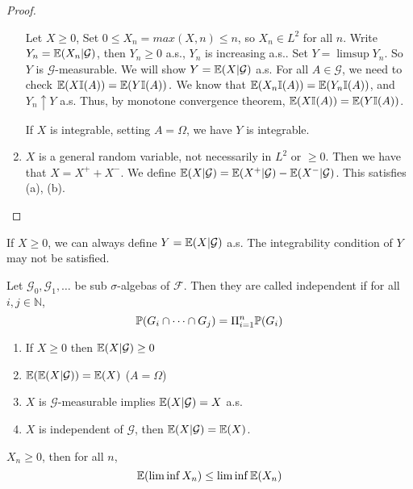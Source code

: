 \begin{proof}
\begin{enumerate}
  Let $X \geq 0$, Set $0 \leq X_{n} = max(X, n) \leq n$, so $X_{n} \in
  L^{2}$ for all $n$. Write $Y_{n} = \E{X_{n} | \mathcal{G}}$, then
  $Y_{n} \geq 0$ a.s., $Y_{n}$ is increasing a.s..  Set $Y = \limsup
  Y_{n}$.  So $Y$ is $\mathcal{G}$-measurable.  We will show $Y = \E{X
    | \mathcal{G}}$ a.s.  For all $A \in \mathcal{G}$, we need to
  check $\E{X \I{A}} = \E{Y \I{A}}.$ We know that
  $\E{X_{n} \I{A}} = \E{Y_{n} \I{A}}$, and $Y_{n}
  \uparrow Y$ a.s.  Thus, by monotone convergence theorem, $\E{X
    \I{A}} = \E{Y\I{A}}$.
  
  If $X$ is integrable, setting $A = \Omega$, we have $Y$ is
  integrable.
\item $X$ is a general random variable, not necessarily in $L^{2}$ or
  $\geq 0$.  Then we have that $X = X^{+} + X^{-}$.  We define $\E{X |
    \mathcal{G}} = \E{X^{+} | \mathcal{G}} - \E{X^{-} | \mathcal{G}}$.
  This satisfies (a), (b).
\end{enumerate}
\end{proof}

\begin{remark}
  If $X \geq 0$, we can always define $Y = \E{X | \mathcal{G}}$ a.s.
  The integrability condition of $Y$ may not be satisfied.
\end{remark}

\begin{defn}
  \label{defn:general:1}
  Let $\mathcal{G}_{0}, \mathcal{G}_{1}, \dots$ be sub $\sigma$-algebas of
  $\mathcal{F}$.  Then they are called independent if for all $i, j
  \in \mathbb{N}$,
  \begin{equation}
    \label{exmp:general:5}
    \Prob{G_i \cap \dots \cap G_j} = \Pi_{i = 1}^{n} \Prob{G_{i}}
  \end{equation}
\end{defn}

\begin{thm}
  \begin{enumerate}
  \item If $X \geq 0$ then $\E{X | \mathcal{G}} \geq 0$
  \item $\E{\E{X | \mathcal{G}}} = \E{X}$ ($A = \Omega$)
  \item $X$ is $\mathcal{G}$-measurable implies $\E{X | \mathcal{G}} = X$ a.s.
  \item $X$ is independent of $\mathcal{G}$, then $\E{X|\mathcal{G}} = \E{X}$.
  \end{enumerate}
\end{thm}

\begin{thm} $X_{n} \geq 0$, then for all $n$,
  \begin{equation}
    \label{exmp:general:6}
    \E{\liminf X_{n}} \leq \liminf \E{X_{n}}
  \end{equation}
\end{thm}

